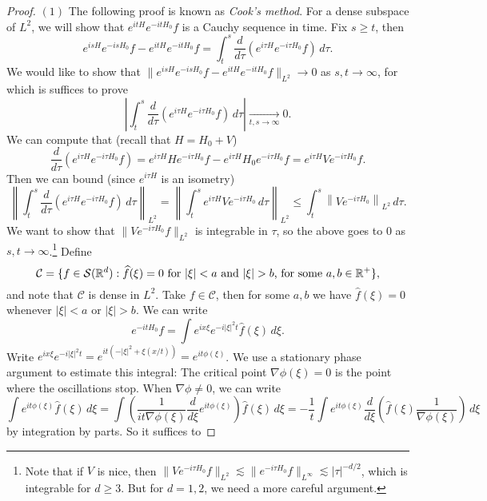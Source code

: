 \begin{proof}
  $(1)$ The following proof is known as \emph{Cook's method}.
  For a dense subspace of $L^2$, we will show that
  $e^{itH} e^{-itH_0} f$ is a Cauchy sequence
  in time. Fix $s \ge t$, then
  \[
    e^{isH} e^{-isH_0} f - e^{itH} e^{-itH_0} f
    = \int_{t}^s \frac{d}{d\tau} (e^{i\tau H} e^{-i\tau H_0} f) \, d\tau.
  \]
  We would like to show that
  $\|e^{isH} e^{-isH_0} f - e^{itH} e^{-itH_0} f\|_{L^2} \to 0$
  as $s, t \to \infty$, for which is suffices to prove
  \[
    \left|\int_{t}^s \frac{d}{d\tau} (e^{i\tau H} e^{-i\tau H_0} f) \, d\tau\right|
    \xrightarrow[t, s \to \infty]{} 0.
  \]
  We can compute that (recall that $H = H_0 + V$)
  \[
    \frac{d}{d\tau} (e^{i\tau H} e^{-i\tau H_0} f)
    = e^{i\tau H} H e^{-i\tau H_0} f
    - e^{i\tau H} H_0 e^{-i\tau H_0} f
    = e^{i\tau H} V e^{-i\tau H_0} f.
  \]
  Then we can bound (since $e^{i\tau H}$ is an isometry)
  \[
    \left\|\int_{t}^s \frac{d}{d\tau} (e^{i\tau H} e^{-i\tau H_0} f) \, d\tau\right\|_{L^2}
    = \left\|\int_{t}^s e^{i\tau H} V e^{-i \tau H_0} \, d\tau\right\|_{L^2}
    \le \int_{t}^s \left\|V e^{-i \tau H_0}\right\|_{L^2} \, d\tau.
  \]
  We want to show that $\|V e^{-i \tau H_0} f\|_{L^2}$
  is integrable in $\tau$, so the above goes to $0$ as $s, t \to \infty$.\footnote{Note that if $V$ is nice, then $\|Ve^{-i\tau H_0} f\|_{L^2} \lesssim \|e^{-i\tau H_0} f\|_{L^\infty} \lesssim |\tau|^{-d / 2}$, which is integrable for $d \ge 3$. But for $d = 1, 2$, we need a more careful argument.}
  Define
  \[
    \mathcal{C} = \{f \in \mathcal{S}(\mathbb{R}^d)
      : \widehat{f}(\xi) = 0 \text{ for  $|\xi| < a$ and $|\xi| > b$, for some $a, b \in \mathbb{R}^+$}
    \},
  \]
  and note that $\mathcal{C}$ is dense in $L^2$.
  Take $f \in \mathcal{C}$, then for some $a, b$
  we have $\widehat{f}(\xi) = 0$ whenever
  $|\xi| < a$ or $|\xi| > b$. We can write
  \[
    e^{-i t H_0} f
    = \int e^{ix\xi} e^{-i |\xi|^2 t}
    \widehat{f}(\xi)\, d\xi.
  \]
  Write $e^{ix \xi} e^{-i |\xi|^2 t} = e^{it (-|\xi|^2 + \xi(x / t))} = e^{it \phi(\xi)}$.
  We use a stationary phase argument to estimate
  this integral: The
  critical point $\nabla \phi(\xi) = 0$ is the point
  where the oscillations stop. When $\nabla \phi \ne 0$,
  we can write
  \[
    \int e^{it\phi(\xi)} \widehat{f}(\xi)\, d\xi
    = \int \left(\frac{1}{it \nabla \phi(\xi)} \frac{d}{d\xi} e^{it \phi(\xi)}\right) \widehat{f}(\xi)\, d\xi
    = -\frac{1}{t} \int e^{it \phi(\xi)} \frac{d}{d\xi} \left(\widehat{f}(\xi) \frac{1}{\nabla \phi(\xi)}\right)\, d\xi
  \]
  by integration by parts. So it suffices to

\end{proof}

